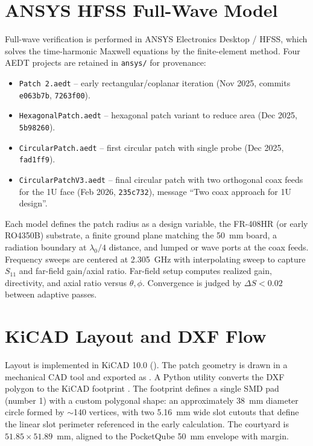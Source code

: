 \section{ANSYS HFSS Full-Wave Model}

Full-wave verification is performed in ANSYS Electronics Desktop / HFSS, which solves the time-harmonic Maxwell equations by the finite-element method. Four AEDT projects are retained in \texttt{ansys/} for provenance:

\begin{itemize}[noitemsep]
    \item \texttt{Patch 2.aedt} -- early rectangular/coplanar iteration (Nov 2025, commits \texttt{e063b7b}, \texttt{7263f00}).
    \item \texttt{HexagonalPatch.aedt} -- hexagonal patch variant to reduce area (Dec 2025, \texttt{5b98260}).
    \item \texttt{CircularPatch.aedt} -- first circular patch with single probe (Dec 2025, \texttt{fad1ff9}).
    \item \texttt{CircularPatchV3.aedt} -- final circular patch with two orthogonal coax feeds for the 1U face (Feb 2026, \texttt{235c732}), message ``Two coax approach for 1U design''.
\end{itemize}

Each model defines the patch radius as a design variable, the FR-408HR (or early RO4350B) substrate, a finite ground plane matching the 50~mm board, a radiation boundary at $\lambda_0/4$ distance, and lumped or wave ports at the coax feeds. Frequency sweeps are centered at 2.305~GHz with interpolating sweep to capture $S_{11}$ and far-field gain/axial ratio. Far-field setup computes realized gain, directivity, and axial ratio versus $\theta,\phi$. Convergence is judged by $\Delta S < 0.02$ between adaptive passes.

\section{KiCAD Layout and DXF Flow}

Layout is implemented in KiCAD 10.0 (). The patch geometry is drawn in a mechanical CAD tool and exported as . A Python utility  converts the DXF polygon to the KiCAD footprint . The footprint defines a single SMD pad (number 1) with a custom polygonal shape: an approximately 38~mm diameter circle formed by $\sim$140 vertices, with two 5.16~mm wide slot cutouts that define the linear slot perimeter referenced in the early calculation. The courtyard is $51.85 \times 51.89$~mm, aligned to the PocketQube 50~mm envelope with margin.

